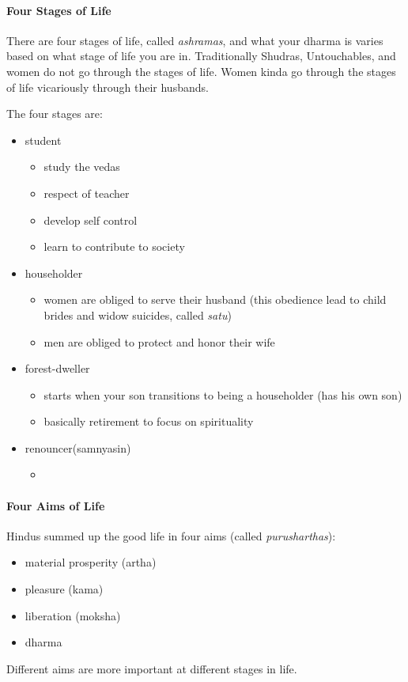\documentclass{article}
\begin{document}
\paragraph{Four Stages of Life}
\label{par:four_stages_of_life}
There are four stages of life, called \emph{ashramas}, and what your dharma is varies based on what stage of life you are in. Traditionally Shudras, Untouchables, and women do not go through the stages of life. Women kinda go through the stages of life vicariously through their husbands.

The four stages are:
\begin{itemize}
	\item student
	\begin{itemize}
		\item study the vedas
		\item respect of teacher
		\item develop self control
		\item learn to contribute to society
	\end{itemize}
	\item householder
	\begin{itemize}
		\item women are obliged to serve their husband (this obedience lead to child brides and widow suicides, called \emph{satu})
		\item men are obliged to protect and honor their wife
	\end{itemize}
	\item forest-dweller
	\begin{itemize}
		\item starts when your son transitions to being a householder (has his own son)
		\item basically retirement to focus on spirituality
	\end{itemize}
	\item renouncer(samnyasin)
	\begin{itemize}
		\item
	\end{itemize}
\end{itemize}

\paragraph{Four Aims of Life}
\label{par:four_aims_of_life}
Hindus summed up the good life in four aims (called \emph{purusharthas}):
\begin{itemize}
	\item material prosperity (artha)
	\item pleasure (kama)
	\item liberation (moksha)
	\item dharma
\end{itemize}
Different aims are more important at different stages in life.
\end{document}

